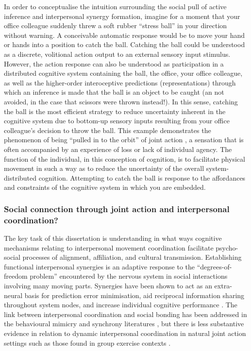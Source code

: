 \begin{mccorrection}
In order to conceptualise the intuition surrounding the social pull of active inference and interpersonal synergy formation, imagine for a moment that your office colleague suddenly threw a soft rubber ``stress ball'' in your direction without warning.  A conceivable automatic response would be to move your hand or hands into a position to catch the ball.
Catching the ball could be understood as a discrete, volitional action output to an external sensory input stimulus. However, the action response can also be understood as participation in a distributed cognitive system containing the ball, the office, your office colleague, as well as the higher-order interoceptive predictions (representations) through which an inference is made that the ball is an object to be caught (an not avoided, in the case that scissors were thrown instead!). In this sense, catching the ball is the most efficient strategy to  reduce uncertainty inherent in the cognitive system due to bottom-up sensory inputs resulting from your office colleague's decision to throw the ball.  This example demonstrates the phenomenon of being ``pulled in to the orbit'' of joint action \citep{Marsh2009}, a sensation that is often accompanied by an experience of loss or lack of individual agency.  The function of the individual, in this conception of cognition, is to facilitate physical movement in such a way as to reduce the uncertainty of the overall system-distributed cognition.  Attempting to catch the ball is response to the affordances and constraints of the cognitive system in which you are embedded.
\end{mccorrection}


\subsubsection{Social connection through joint action and interpersonal coordination?}
The key task of this dissertation is understanding in what ways cognitive mechanisms relating to interpersonal movement coordination facilitate psycho-social processes of alignment, affiliation, and cultural transmission\citep{Marsh2009}.  Establishing functional interpersonal synergies is an adaptive response to the ``degrees-of-freedom problem'' encountered by the nervous system in social interactions involving many moving parts.  Synergies have been shown to act as an extra-neural basis for prediction error minimisation, aid reciprocal information sharing throughout system nodes, and increase individual cognitive performance \citep{Schmidt2016}.
The link between interpersonal coordination and social bonding has been addressed in the behavioural mimicry and synchrony literatures \citep[e.g.,][]{Wheatley2012,Launay2016,Mogan2017}, but there is less substantive evidence in relation to dynamic interpersonal coordination in natural joint action settings such as those found in group exercise contexts \citep{Marsh2009,Miles2009,Lumsden2012}.

